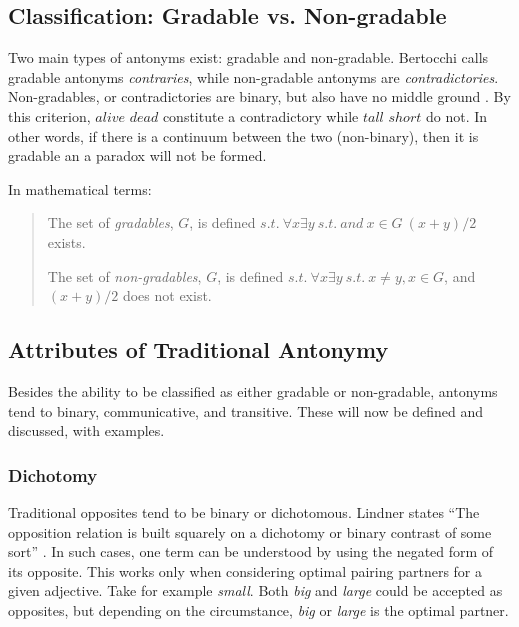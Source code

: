 \subsection {Classification: Gradable vs. Non-gradable}
\label{classification}
Two main types of antonyms exist: gradable and non-gradable. Bertocchi calls gradable antonyms \textit{contraries}, while non-gradable antonyms are \textit{contradictories}.   Non-gradables, or contradictories are binary, but also have no middle ground \cite{Bertocchi}.  By this criterion, $alive$ \opp $dead$ constitute a contradictory while $tall$ \opp $short$ do not.  In other words, if there is a continuum between the two (non-binary), then it is gradable an a paradox will not be formed. 

In mathematical terms: 
	\begin{quote}
		The set of \textit{gradables}, $G$, is defined $s.t.~ \forall x \exists y~s.t.~and~x \in G~(x+y)/2$ exists.

		The set of \textit{non-gradables}, $G$, is defined $s.t.~ \forall x \exists y~s.t.~x\not=y, x \in G$, and $(x+y)/2$ does not exist.
	\end{quote}


\subsection {Attributes of Traditional Antonymy} 
Besides the ability to be classified as either gradable or non-gradable, antonyms tend to binary, communicative, and transitive. These will now be defined and discussed, with examples.  

\subsubsection {Dichotomy} 
Traditional opposites tend to be binary or dichotomous.  Lindner states ``The opposition relation is built squarely on a dichotomy or binary contrast of some sort'' \cite{UpDown}. In such cases, one term can be understood by using the negated form of its opposite.  This works only when considering optimal pairing partners for a given adjective.  Take for example \textit{small}.  Both \textit{big} and \textit{large} could be accepted as opposites, but depending on the circumstance, \textit{big} or \textit{large} is the optimal partner.

